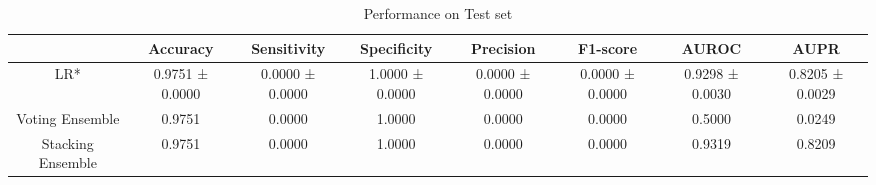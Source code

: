 \begin{table}[h!]
    \centering
    \caption{Performance on Test set}
    \begin{adjustbox}{width=\textwidth}
    \begin{tabular}{|c|c|c|c|c|c|c|c|}
    \hline
      & Accuracy & Sensitivity & Specificity & Precision & F1-score & AUROC & AUPR \\
    \hline
    LR* & 0.9751 ± 0.0000 & 0.0000 ± 0.0000 & 1.0000 ± 0.0000 & 0.0000 ± 0.0000 & 0.0000 ± 0.0000 & 0.9298 ± 0.0030 & 0.8205 ± 0.0029 \\
    \hline
    Voting Ensemble & 0.9751 & 0.0000 & 1.0000 & 0.0000 & 0.0000 & 0.5000 & 0.0249 \\
    \hline
    Stacking Ensemble & 0.9751 & 0.0000 & 1.0000 & 0.0000 & 0.0000 & 0.9319 & 0.8209 \\
    \hline
    \end{tabular}
    \end{adjustbox}
    \end{table}
    
